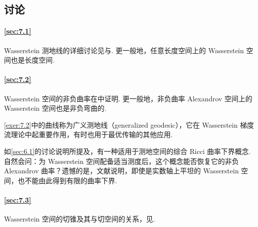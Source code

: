 \subsection{讨论}\label{sec:7.4}
\paragraph{\autoref{sec:7.1}}
Wasserstein 测地线的详细讨论见\cite[第5章]{ref315}与\cite[第7章]{ref18}. 更一般地，任意长度空间上的 Wasserstein 空间也是长度空间.

\paragraph{\autoref{sec:7.2}}
Wasserstein 空间的非负曲率在\cite[第7.3节]{ref18}中证明. 更一般地，非负曲率 Alexandrov 空间上的 Wasserstein 空间也是非负弯曲的.

\autoref{exer:7.2}中的曲线称为广义测地线（generalized geodesic），它在 Wasserstein 梯度流理论中起重要作用，有时也用于最优传输的其他应用.

如\autoref{sec:6.1}的讨论说明所提及，有一种适用于测地空间的综合 Ricci 曲率下界概念. 自然会问：为 Wasserstein 空间配备适当测度后，这个概念能否恢复它的非负 Alexandrov 曲率？遗憾的是，文献\cite{ref87}说明，即使是实数轴上平坦的 Wasserstein 空间，也不能由此得到有限的曲率下界.

\paragraph{\autoref{sec:7.3}}
Wasserstein 空间的切锥及其与切空间的关系，见\cite[第12.4节]{ref18}.
